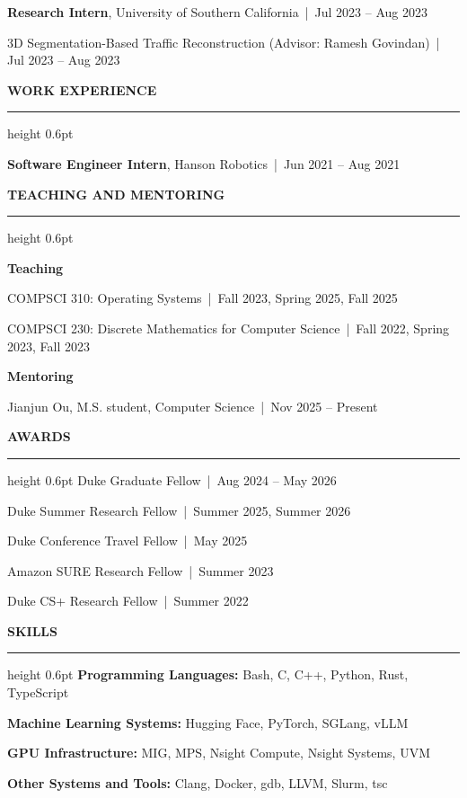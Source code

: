 \documentclass[11pt,letterpaper]{article}
\makeatletter
\newcommand{\cvsection}[1]{%
  \par\penalty-50\addvspace{8pt}%
  {\bfseries\small\MakeUppercase{#1}\par}\nobreak
  \vspace{3pt}\hrule height 0.6pt\nobreak%
  \addvspace{5pt}%
  \@afterheading}
\newcommand{\cvsubsection}[1]{%
  \par\addvspace{2pt}%
  {\bfseries #1\par}\nobreak%
  \@afterheading}
\newcommand{\cvrole}[3]{%
  \par\addvspace{2pt}%
  {\textbf{#1}, #2 \,|\, #3\par}\nobreak
  \@afterheading}
\newcommand{\entry}[2]{#1 \,|\, #2\par}
\newcommand{\simpleline}[2]{#1 \,|\, #2\par}
\makeatother
\begin{document}
\cvrole{Research Intern}{University of Southern California}{Jul 2023 -- Aug 2023}
\entry{3D Segmentation-Based Traffic Reconstruction (Advisor: Ramesh Govindan)}{Jul 2023 -- Aug 2023}

\cvsection{Work Experience}
\cvrole{Software Engineer Intern}{Hanson Robotics}{Jun 2021 -- Aug 2021}

\cvsection{Teaching and Mentoring}
\cvsubsection{Teaching}
\simpleline{COMPSCI 310: Operating Systems}{Fall 2023, Spring 2025, Fall 2025}
\simpleline{COMPSCI 230: Discrete Mathematics for Computer Science}{Fall 2022, Spring 2023, Fall 2023}
\cvsubsection{Mentoring}
\simpleline{Jianjun Ou, M.S. student, Computer Science}{Nov 2025 -- Present}

\cvsection{Awards}
\simpleline{Duke Graduate Fellow}{Aug 2024 -- May 2026}
\simpleline{Duke Summer Research Fellow}{Summer 2025, Summer 2026}
\simpleline{Duke Conference Travel Fellow}{May 2025}
\simpleline{Amazon SURE Research Fellow}{Summer 2023}
\simpleline{Duke CS+ Research Fellow}{Summer 2022}

\cvsection{Skills}
\textbf{Programming Languages:} Bash, C, C++, Python, Rust, TypeScript\par
\textbf{Machine Learning Systems:} Hugging Face, PyTorch, SGLang, vLLM\par
\textbf{GPU Infrastructure:} MIG, MPS, Nsight Compute, Nsight Systems, UVM\par
\textbf{Other Systems and Tools:} Clang, Docker, gdb, LLVM, Slurm, tsc\par
\end{document}
